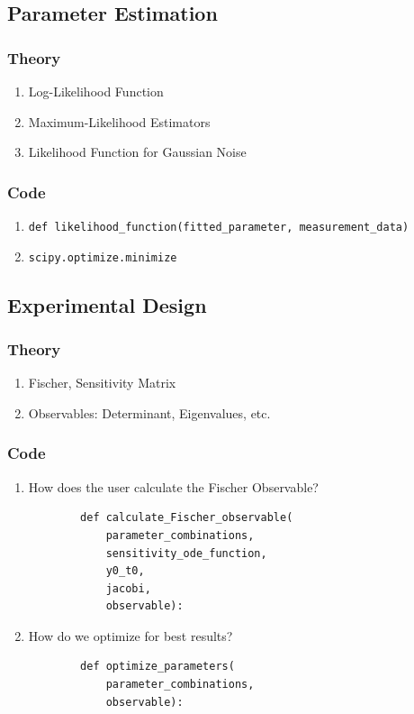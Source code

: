 \documentclass[10pt,A4paper]{article}
\begin{document}
\subsection*{Parameter Estimation}
\subsubsection*{Theory}
\begin{enumerate}
    \item Log-Likelihood Function
    \item Maximum-Likelihood Estimators
    \item Likelihood Function for Gaussian Noise
\end{enumerate}
\subsubsection*{Code}
\begin{enumerate}
    \item \texttt{def likelihood_function(fitted_parameter, measurement_data)}
    \item \texttt{scipy.optimize.minimize}
\end{enumerate}
%
\subsection*{Experimental Design}
\subsubsection*{Theory}
\begin{enumerate}
    \item Fischer, Sensitivity Matrix
    \item Observables: Determinant, Eigenvalues, etc.
\end{enumerate}
\subsubsection*{Code}
\begin{enumerate}
    \item How does the user calculate the Fischer Observable?
    \begin{verbatim}
        def calculate_Fischer_observable(
            parameter_combinations,
            sensitivity_ode_function,
            y0_t0,
            jacobi,
            observable):
    \end{verbatim}
    \item How do we optimize for best results?
    \begin{verbatim}
        def optimize_parameters(
            parameter_combinations,
            observable):
    \end{verbatim}
\end{enumerate}
%
%
%
\end{document}
